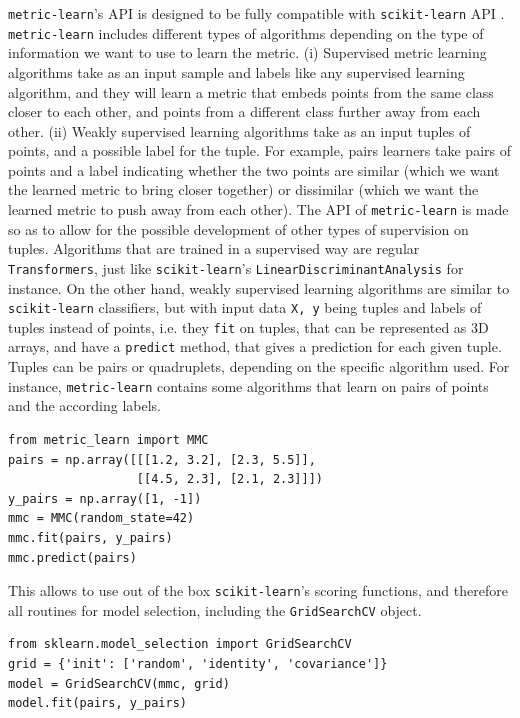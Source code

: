 \documentclass[twoside,11pt]{article}
\begin{document}
\texttt{metric-learn}'s API is designed to be fully compatible with \texttt{scikit-learn} API \cite{scikit-learn}. \texttt{metric-learn} includes different types of algorithms depending on the type of information we want to use to learn the metric. (i) Supervised metric learning algorithms take as an input sample and labels like any supervised learning algorithm, and they will learn a metric that embeds points from the same class closer to each other, and points from a different class further away from each other. (ii) Weakly supervised learning algorithms take as an input tuples of points, and a possible label for the tuple. For example, pairs learners take pairs of points and a label indicating whether the two points are similar (which we want the learned metric to bring closer together) or dissimilar (which we want the learned metric to push away from each other). The API of \texttt{metric-learn} is made so as to allow for the possible development of other types of supervision on tuples. Algorithms that are trained in a supervised way are regular \texttt{Transformers}, just like \texttt{scikit-learn}'s \texttt{LinearDiscriminantAnalysis} for instance. On the other hand, weakly supervised learning algorithms are similar to \texttt{scikit-learn} classifiers, but with input data \texttt{X, y} being tuples and labels of tuples instead of points, i.e. they \texttt{fit} on tuples, that can be represented as 3D arrays, and have a \texttt{predict} method, that gives a prediction for each given tuple. Tuples can be pairs or quadruplets, depending on the specific algorithm used. For instance, \texttt{metric-learn} contains some algorithms that learn on pairs of points and the according labels. 

\begin{verbatim}
from metric_learn import MMC
pairs = np.array([[[1.2, 3.2], [2.3, 5.5]],
                  [[4.5, 2.3], [2.1, 2.3]]])
y_pairs = np.array([1, -1])
mmc = MMC(random_state=42)
mmc.fit(pairs, y_pairs)
mmc.predict(pairs)
\end{verbatim}


This allows to use out of the box \texttt{scikit-learn}'s scoring functions, and therefore all routines for model selection, including the \texttt{GridSearchCV} object. 

\begin{verbatim}
from sklearn.model_selection import GridSearchCV
grid = {'init': ['random', 'identity', 'covariance']}
model = GridSearchCV(mmc, grid)
model.fit(pairs, y_pairs)
\end{verbatim}
\end{document}
